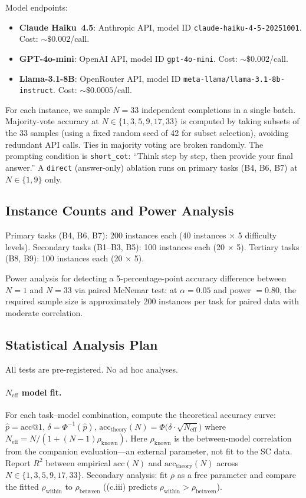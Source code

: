 \documentclass{article}
\theoremstyle{definition}
\theoremstyle{remark}
\begin{document}
Model endpoints:
\begin{itemize}[leftmargin=*,itemsep=1pt]
    \item \textbf{Claude Haiku~4.5}: Anthropic API, model ID \texttt{claude-haiku-4-5-20251001}. Cost: ${\sim}\$0.002$/call.
    \item \textbf{GPT-4o-mini}: OpenAI API, model ID \texttt{gpt-4o-mini}. Cost: ${\sim}\$0.002$/call.
    \item \textbf{Llama-3.1-8B}: OpenRouter API, model ID \texttt{meta-llama/llama-3.1-8b-instruct}. Cost: ${\sim}\$0.0005$/call.
\end{itemize}

For each instance, we sample $N = 33$ independent completions in a single batch.
Majority-vote accuracy at $N \in \{1, 3, 5, 9, 17, 33\}$ is computed by taking subsets of the 33 samples (using a fixed random seed of 42 for subset selection), avoiding redundant API calls.
Ties in majority voting are broken randomly.
The prompting condition is \texttt{short\_cot}: ``Think step by step, then provide your final answer.''
A \texttt{direct} (answer-only) ablation runs on primary tasks (B4, B6, B7) at $N \in \{1, 9\}$ only.

\subsection{Instance Counts and Power Analysis}

Primary tasks (B4, B6, B7): 200 instances each (40 instances $\times$ 5 difficulty levels).
Secondary tasks (B1--B3, B5): 100 instances each (20 $\times$ 5).
Tertiary tasks (B8, B9): 100 instances each (20 $\times$ 5).

Power analysis for detecting a 5-percentage-point accuracy difference between $N = 1$ and $N = 33$ via paired McNemar test: at $\alpha = 0.05$ and power $= 0.80$, the required sample size is approximately 200 instances per task for paired data with moderate correlation.

\subsection{Statistical Analysis Plan}

All tests are pre-registered. No ad hoc analyses.

\paragraph{$N_{\text{eff}}$ model fit.}
For each task--model combination, compute the theoretical accuracy curve:
$\hat{p} = \text{acc}@1$, $\delta = \Phi^{-1}(\hat{p})$, $\text{acc}_{\text{theory}}(N) = \Phi\bigl(\delta \cdot \sqrt{N_{\text{eff}}}\bigr)$ where $N_{\text{eff}} = N/(1 + (N-1)\rho_{\text{known}})$.
Here $\rho_{\text{known}}$ is the between-model correlation from the companion evaluation---an external parameter, not fit to the SC data.
Report $R^2$ between empirical $\text{acc}(N)$ and $\text{acc}_{\text{theory}}(N)$ across $N \in \{1, 3, 5, 9, 17, 33\}$.
Secondary analysis: fit $\rho$ as a free parameter and compare the fitted $\rho_{\text{within}}$ to $\rho_{\text{between}}$ ((c.iii) predicts $\rho_{\text{within}} > \rho_{\text{between}}$).
\end{document}

